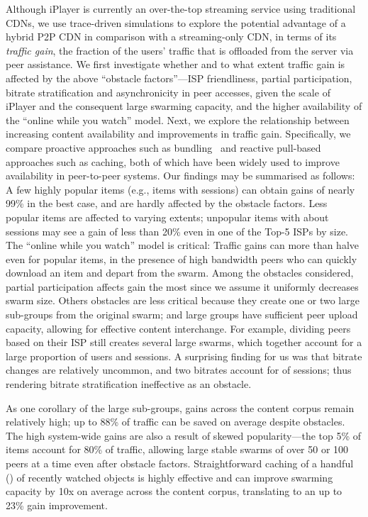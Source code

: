 \documentclass[10pt, conference, letterpaper]{IEEEtran}
\begin{document}
Although iPlayer is currently an over-the-top streaming service using traditional CDNs, we use trace-driven simulations to explore the potential advantage of a hybrid P2P CDN in comparison with a streaming-only CDN, in terms of its \emph{traffic gain}, the fraction of the users' traffic that is offloaded from the server via peer assistance. We first investigate whether and to what extent traffic gain is affected by the above ``obstacle factors''---ISP friendliness, partial participation, bitrate stratification and asynchronicity in peer accesses, given the scale of iPlayer and the consequent large swarming capacity, and the higher availability of the ``online while you watch'' model. Next, we explore the relationship between increasing content availability and improvements in traffic gain. Specifically, we compare proactive approaches such as bundling~\cite{menasche2013content} and reactive pull-based approaches such as caching, both of which have been widely used to improve availability in peer-to-peer systems. Our findings may be summarised as follows:
A few highly popular items (e.g., items with  sessions) can obtain gains of nearly 99\% in the best case, and are hardly affected by the obstacle factors. Less popular items are affected to varying extents; unpopular items with about  sessions may see a gain of less than 20\% even in one of the Top-5 ISPs by size. The ``online while you watch'' model is critical: Traffic gains can more than halve even for popular items, in the presence of high bandwidth peers who can quickly download an item and depart from the swarm.
Among the obstacles considered, partial participation affects gain the most since we assume it uniformly decreases  swarm size. Others obstacles are less critical because they create one or two large sub-groups from the original swarm; and large groups have sufficient peer upload capacity, allowing for effective content interchange. For example, dividing peers based on their ISP still creates several large swarms, which together account for a large proportion of users and sessions. A surprising  finding for us was that bitrate changes are relatively uncommon, and two bitrates account for  of sessions; thus rendering bitrate stratification ineffective as an obstacle. 


As one corollary of the large sub-groups, gains across the  content corpus remain relatively high; up to 88\% of traffic can be saved on average despite obstacles. The high system-wide gains are also a result of skewed popularity---the top 5\% of items account for 80\% of traffic, allowing large stable swarms of over 50 or 100 peers at a time even after obstacle factors.
Straightforward caching of a handful () of recently watched objects is highly effective and can improve swarming capacity by 10x on average across the content corpus, translating to an up to 23\% gain improvement.
\end{document}
